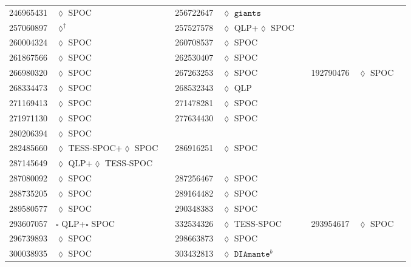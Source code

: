 \begin{longtable}{llrllr}
246965431 & $\lozenge$ SPOC & \cite{TIC_348755728} & 256722647 & $\lozenge$ $\texttt{giants}$ & \cite{TIC_348835438} \\
257060897 & $\lozenge^\dagger$ & \cite{TIC_257060897} & 257527578 & $\lozenge$ QLP+$\lozenge$ SPOC & \cite{TIC_124029677} \\
260004324 & $\lozenge$ SPOC & \cite{TIC_103633434} & 260708537 & $\lozenge$ SPOC & \cite{TIC_260708537} \\
261867566 & $\lozenge$ SPOC & \cite{TIC_261867566} & 262530407 & $\lozenge$ SPOC & \cite{TIC_262530407} \\
266980320 & $\lozenge$ SPOC & \cite{TIC_70513361} & 267263253 & $\lozenge$ SPOC & \cite{TIC_267263253} & 192790476 & $\lozenge$ SPOC & \cite{TIC_428699140} \\
268334473 & $\lozenge$ SPOC & \cite{TIC_232540264} & 268532343 & $\lozenge$ QLP & \cite{TIC_268532343} \\
271169413 & $\lozenge$ SPOC & \cite{TIC_159418353} & 271478281 & $\lozenge$ SPOC & \cite{TIC_428699140} \\
271971130 & $\lozenge$ SPOC & \cite{TIC_271971130} & 277634430 & $\lozenge$ SPOC & \cite{TIC_159418353} \\
280206394 & $\lozenge$ SPOC & \cite{TIC_280206394} \\
282485660 & $\lozenge$ TESS-SPOC+$\lozenge$ SPOC & \cite{TIC_282485660} & 286916251 & $\lozenge$ SPOC & \cite{TIC_232540264} \\
287145649 & $\lozenge$ QLP+$\lozenge$ TESS-SPOC & \cite{TIC_332534326} \\
287080092 & $\lozenge$ SPOC & \cite{TIC_232540264} & 287256467 & $\lozenge$ SPOC & \cite{TIC_287256467} \\
288735205 & $\lozenge$ SPOC & \cite{TIC_288735205} & 289164482 & $\lozenge$ SPOC & \cite{TIC_348755728} \\
289580577 & $\lozenge$ SPOC & \cite{TIC_232540264} & 290348383 & $\lozenge$ SPOC & \cite{TIC_290348383} \\
293607057 & $\square$ QLP+$\square$ SPOC & \cite{TIC_293607057} & 332534326 & $\lozenge$ TESS-SPOC & \cite{TIC_332534326} & 293954617 & $\lozenge$ SPOC & \cite{TIC_293954617} \\
296739893 & $\lozenge$ SPOC & \cite{TIC_296739893} & 298663873 & $\lozenge$ SPOC & \cite{TIC_298663873} \\
300038935 & $\lozenge$ SPOC & \cite{TIC_300038935} & 303432813 & $\lozenge$ $\texttt{DIAmante}^b$ & \cite{TIC_303432813} \\

\end{longtable}
